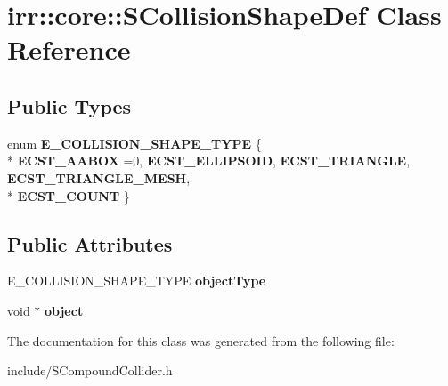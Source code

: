 \hypertarget{classirr_1_1core_1_1SCollisionShapeDef}{}\section{irr\+:\+:core\+:\+:S\+Collision\+Shape\+Def Class Reference}
\label{classirr_1_1core_1_1SCollisionShapeDef}
\subsection*{Public Types}
\begin{DoxyCompactItemize}
\item 
enum {\bfseries E\+\_\+\+C\+O\+L\+L\+I\+S\+I\+O\+N\+\_\+\+S\+H\+A\+P\+E\+\_\+\+T\+Y\+PE} \{ \\*
{\bfseries E\+C\+S\+T\+\_\+\+A\+A\+B\+OX} =0, 
{\bfseries E\+C\+S\+T\+\_\+\+E\+L\+L\+I\+P\+S\+O\+ID}, 
{\bfseries E\+C\+S\+T\+\_\+\+T\+R\+I\+A\+N\+G\+LE}, 
{\bfseries E\+C\+S\+T\+\_\+\+T\+R\+I\+A\+N\+G\+L\+E\+\_\+\+M\+E\+SH}, 
\\*
{\bfseries E\+C\+S\+T\+\_\+\+C\+O\+U\+NT}
 \}\hypertarget{classirr_1_1core_1_1SCollisionShapeDef_ae196e7d4fe5c648f7c9676e24965f2a7}{}\label{classirr_1_1core_1_1SCollisionShapeDef_ae196e7d4fe5c648f7c9676e24965f2a7}

\end{DoxyCompactItemize}
\subsection*{Public Attributes}
\begin{DoxyCompactItemize}
\item 
E\+\_\+\+C\+O\+L\+L\+I\+S\+I\+O\+N\+\_\+\+S\+H\+A\+P\+E\+\_\+\+T\+Y\+PE {\bfseries object\+Type}\hypertarget{classirr_1_1core_1_1SCollisionShapeDef_a0dc19a50d8472946082a789fe476145b}{}\label{classirr_1_1core_1_1SCollisionShapeDef_a0dc19a50d8472946082a789fe476145b}

\item 
void $\ast$ {\bfseries object}\hypertarget{classirr_1_1core_1_1SCollisionShapeDef_af3b3fbc07511ea9650b5dd90f18a9760}{}\label{classirr_1_1core_1_1SCollisionShapeDef_af3b3fbc07511ea9650b5dd90f18a9760}

\end{DoxyCompactItemize}


The documentation for this class was generated from the following file\+:\begin{DoxyCompactItemize}
\item 
include/S\+Compound\+Collider.\+h\end{DoxyCompactItemize}
